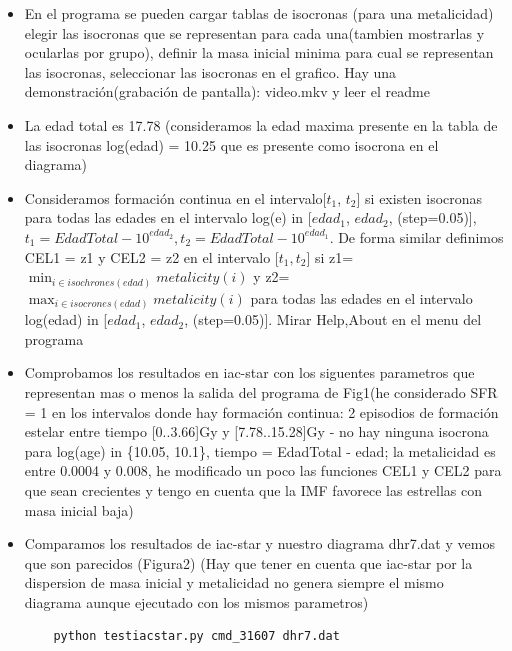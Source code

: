 \documentclass[10pt]{book}
\begin{document}
\begin{itemize}
\item En el programa se pueden cargar tablas de isocronas (para una metalicidad) elegir las isocronas que se representan para cada una(tambien mostrarlas y ocularlas por grupo), definir la masa inicial minima para cual se representan las isocronas, seleccionar las isocronas en el grafico. Hay una demonstración(grabación de pantalla): video.mkv y leer el readme
\item La edad total es 17.78 (consideramos la edad maxima presente en la tabla de las isocronas log(edad) = 10.25 que es presente como isocrona en el diagrama)
\item Consideramos formación continua en el intervalo[$t_1$, $t_2$]  si existen isocronas para todas las edades en el intervalo log(e) in [$edad_1$, $edad_2$,  (step=0.05)], $t_1=EdadTotal - 10^{edad_2}, t_2=EdadTotal - 10^{edad_1}$. De forma similar definimos CEL1 = z1 y CEL2 = z2 en el intervalo [$t_1, t_2$] si z1=$\displaystyle \min_{i \in isochrones(edad)} metalicity(i)$ y z2=$\displaystyle \max_{i \in isocrones(edad)} metalicity(i)$ para todas las edades  en el intervalo log(edad) in [$edad_1$, $edad_2$,  (step=0.05)]. Mirar Help,About en el menu del programa
\item Comprobamos los resultados en iac-star con los siguentes parametros que representan mas o menos la salida del programa de Fig1(he considerado SFR = 1 en los intervalos donde hay formación continua: 2 episodios de formación estelar entre tiempo [0..3.66]Gy y [7.78..15.28]Gy - no hay ninguna isocrona para log(age) in \{10.05, 10.1\}, tiempo = EdadTotal - edad; la metalicidad es entre 0.0004 y 0.008, he modificado un poco las funciones  CEL1 y CEL2 para que sean crecientes y tengo en cuenta que la IMF favorece las estrellas con masa inicial baja)



\item Comparamos los resultados de iac-star y nuestro diagrama dhr7.dat y vemos que son parecidos (Figura2) (Hay que tener en cuenta que iac-star por la dispersion de masa inicial y metalicidad no genera siempre el mismo diagrama aunque ejecutado con los mismos parametros) 
\begin{verbatim}
	python testiacstar.py cmd_31607 dhr7.dat
\end{verbatim}



\end{itemize}
\end{document}
